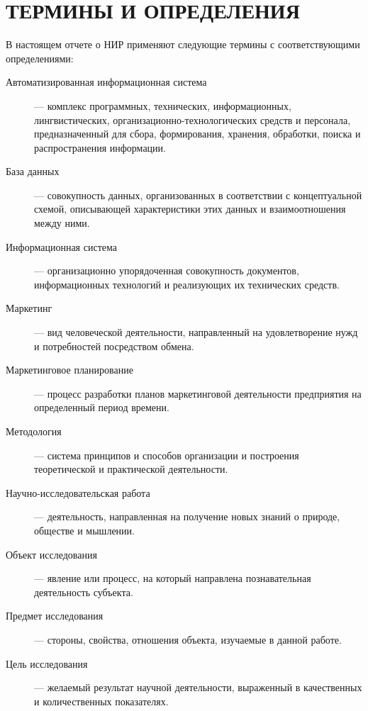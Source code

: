 \chapter*{ТЕРМИНЫ И ОПРЕДЕЛЕНИЯ}

В настоящем отчете о НИР применяют следующие термины с соответствующими определениями:

\begin{description}
    \item[Автоматизированная информационная система] — комплекс программных, технических, информационных, лингвистических, организационно-технологических средств и персонала, предназначенный для сбора, формирования, хранения, обработки, поиска и распространения информации.
    
    \item[База данных] — совокупность данных, организованных в соответствии с концептуальной схемой, описывающей характеристики этих данных и взаимоотношения между ними.
    
    \item[Информационная система] — организационно упорядоченная совокупность документов, информационных технологий и реализующих их технических средств.
    
    \item[Маркетинг] — вид человеческой деятельности, направленный на удовлетворение нужд и потребностей посредством обмена.
    
    \item[Маркетинговое планирование] — процесс разработки планов маркетинговой деятельности предприятия на определенный период времени.
    
    \item[Методология] — система принципов и способов организации и построения теоретической и практической деятельности.
    
    \item[Научно-исследовательская работа] — деятельность, направленная на получение новых знаний о природе, обществе и мышлении.
    
    \item[Объект исследования] — явление или процесс, на который направлена познавательная деятельность субъекта.
    
    \item[Предмет исследования] — стороны, свойства, отношения объекта, изучаемые в данной работе.
    
    \item[Цель исследования] — желаемый результат научной деятельности, выраженный в качественных и количественных показателях.
\end{description}

\newpage

